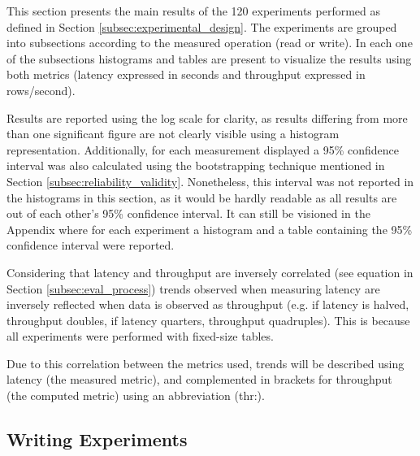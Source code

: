 This section presents the main results of the 120 experiments performed as defined in Section \ref{subsec:experimental_design}. The experiments are grouped into subsections according to the measured operation (read or write). In each one of the subsections histograms and tables are present to visualize the results using both metrics (latency expressed in seconds and throughput expressed in rows/second).

Results are reported using the log scale for clarity, as results differing from more than one significant figure are not clearly visible using a histogram representation. Additionally, for each measurement displayed a 95\% confidence interval was also calculated using the bootstrapping technique mentioned in Section \ref{subsec:reliability_validity}. Nonetheless, this interval was not reported in the histograms in this section, as it would be hardly readable as all results are out of each other's 95\% confidence interval. It can still be visioned in the Appendix  where for each experiment a histogram and a table containing the 95\% confidence interval were reported.

Considering that latency and throughput are inversely correlated (see equation in Section \ref{subsec:eval_process}) trends observed when measuring latency are inversely reflected when data is observed as throughput (e.g. if latency is halved, throughput doubles, if latency quarters, throughput quadruples). This is because all experiments were performed with fixed-size tables.

Due to this correlation between the metrics used, trends will be described using latency (the measured metric), and complemented in brackets for throughput (the computed metric) using an abbreviation (thr:).

\subsection{Writing Experiments}

